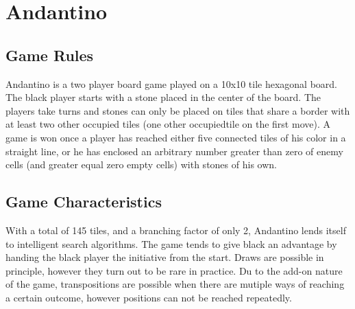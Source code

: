 \section{Andantino}

\subsection{Game Rules}
Andantino is a two player board game played on a 10x10 tile hexagonal board. The black player starts with a stone placed in the center of the board. The players take turns and stones can only be placed on tiles that share a border with at least two other occupied tiles (one other occupiedtile on the first move). A game is won once a player has reached either five connected tiles of his color in a straight line, or he has enclosed an arbitrary number greater than zero of enemy cells (and greater equal zero empty cells) with stones of his own.


\subsection{Game Characteristics}
With a total of 145 tiles, and a branching factor of only 2, Andantino lends itself to intelligent search algorithms. The game tends to give black an advantage by handing the black player the initiative from the start. Draws are possible in principle, however they turn out to be rare in practice. Du to the add-on nature of the game, transpositions are possible when there are mutiple ways of reaching a certain outcome, however positions can not be reached repeatedly.